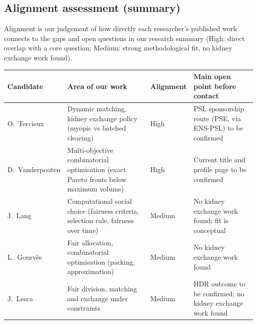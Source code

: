 \documentclass[10pt]{article}
\begin{document}
\subsection*{Alignment assessment (summary)}
Alignment is our judgement of how directly each researcher's published work connects
to the gaps and open questions in our research summary (High: direct overlap with a
core question; Medium: strong methodological fit, no kidney exchange work found).
\begin{center}
\small
\renewcommand{\arraystretch}{1.2}
\begin{tabularx}{\textwidth}{@{}p{2.4cm}p{3.2cm}p{1.3cm}X@{}}
\toprule
Candidate & Area of our work & Alignment & Main open point before contact \\
\midrule
O.~Tercieux & Dynamic matching, kidney exchange policy (myopic vs batched clearing) & High
  & PSL sponsorship route (PSE, via ENS-PSL) to be confirmed \\
D.~Vanderpooten & Multi-objective combinatorial optimisation (exact Pareto fronts below
  maximum volume) & High & Current title and profile page to be confirmed \\
J.~Lang & Computational social choice (fairness criteria, selection rule, fairness over
  time) & Medium & No kidney exchange work found; fit is conceptual \\
L.~Gourv\`es & Fair allocation, combinatorial optimisation (packing, approximation) &
  Medium & No kidney exchange work found \\
J.~Lesca & Fair division, matching and exchange under constraints & Medium
  & HDR outcome to be confirmed; no kidney exchange work found \\
\bottomrule
\end{tabularx}
\end{center}
\end{document}
